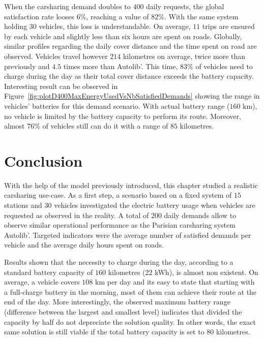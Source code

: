 \begin{bibunit}[ieeetr]
\bigskip
When the carsharing demand doubles to $400$ daily requests, the global satisfaction rate looses $6$\%, reaching a value of $82$\%.
With the same system holding $30$ vehicles, this loss is understandable.
On average, $11$ trips are ensured by each vehicle and slightly less than six hours are spent on roads.
Globally, similar profiles regarding the daily cover distance and the time spent on road are observed.
Vehicles travel however $214$ kilometres on average, twice more than previously and $4.5$ times more than Autolib'.
This time, $83$\% of vehicles need to charge during the day as their total cover distance exceeds the battery capacity.
Interesting result can be observed in Figure~\ref{fig:plotD400MaxEnergyUsedVsNbSatisfiedDemands} showing the range in vehicles' batteries for this demand scenario.
With actual battery range ($160$ km), no vehicle is limited by the battery capacity to perform its route.
Moreover, almost $76$\% of vehicles still can do it with a range of $85$ kilometres.

%

\section{Conclusion} \label{sec:energyExp:conclusion}
With the help of the model {\ENERGY} previously introduced, this chapter studied a realistic carsharing use-case.
As a first step, a scenario based on a fixed system of $15$ stations and $30$ vehicles investigated the electric battery usage when vehicles are requested as observed in the reality.
A total of $200$ daily demands allow to observe similar operational performance as the Parisian carsharing system Autolib'.
Targeted indicators were the average number of satisfied demands per vehicle and the average daily hours spent on roads.

\medskip
Results shown that the necessity to charge during the day, according to a standard battery capacity of $160$ kilometres ($22$ kWh), is almost non existent.
On average, a vehicle covers $108$ km per day and its easy to state that starting with a full-charge battery in the morning, most of them can achieve their route at the end of the day.
More interestingly, the observed maximum battery range (difference between the largest and smallest level) indicates that divided the capacity by half do not depreciate the solution quality.
In other words, the exact same solution is still viable if the total battery capacity is set to $80$ kilometres.


\end{bibunit}
